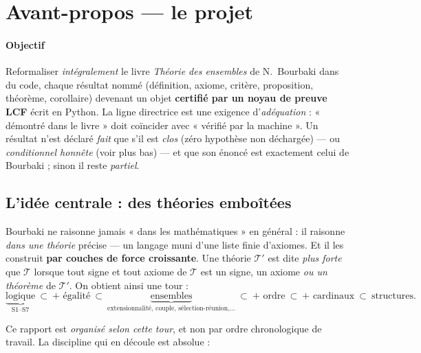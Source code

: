 \section*{Avant-propos --- le projet}

\paragraph{Objectif} Reformaliser \emph{intégralement} le livre \emph{Théorie
des ensembles} de N.~Bourbaki dans du code, chaque résultat nommé (définition,
axiome, critère, proposition, théorème, corollaire) devenant un objet
\theoreme{} \textbf{certifié par un noyau de preuve LCF} écrit en Python. La
ligne directrice est une exigence d'\emph{adéquation} : « démontré dans le
livre » doit coïncider avec « vérifié par la machine ». Un résultat n'est
déclaré \emph{fait} que s'il est \emph{clos} (zéro hypothèse non déchargée) ---
ou \emph{conditionnel honnête} (voir plus bas) --- et que son énoncé est
exactement celui de Bourbaki ; sinon il reste \emph{partiel}.

\subsection*{L'idée centrale : des théories emboîtées}

Bourbaki ne raisonne jamais « dans les mathématiques » en général : il raisonne
\emph{dans une théorie} précise --- un langage muni d'une liste finie d'axiomes.
Et il les construit \textbf{par couches de force croissante}. Une théorie
$\mathcal{T}'$ est dite \emph{plus forte} que $\mathcal{T}$ lorsque tout signe
et tout axiome de $\mathcal{T}$ est un signe, un axiome \emph{ou un théorème} de
$\mathcal{T}'$. On obtient ainsi une tour :
\[
  \underbrace{\text{logique}}_{\text{S1--S7}}\ \subset\
  \text{+ égalité}\ \subset\
  \underbrace{\text{ensembles}}_{\text{extensionnalité, couple, sélection-réunion,\ldots}}\ \subset\
  \text{+ ordre}\ \subset\ \text{+ cardinaux}\ \subset\ \text{structures}.
\]

Ce rapport est \emph{organisé selon cette tour}, et non par ordre
chronologique de travail. La discipline qui en découle est absolue :

